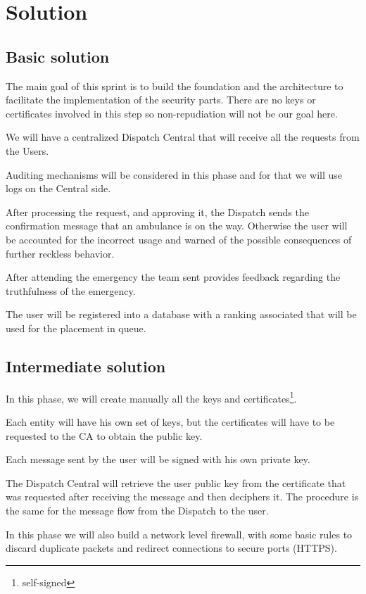 \documentclass[a4paper,titlepage,11pt]{article}
\begin{document}
\newpage

\section{Solution}
\subsection{Basic solution}
The main goal of this sprint is to build the foundation and the architecture to facilitate the implementation
of the security parts. There are no keys or certificates involved in this step so non-repudiation will not be
our goal here.

We will have a centralized Dispatch Central that will receive all the requests from the Users.

Auditing mechanisms will be considered in this phase and for that we will use logs on the Central side.

After processing the request, and approving it, the Dispatch sends the confirmation message that an ambulance is
on the way. Otherwise the user will be accounted for the incorrect usage and warned of the possible consequences
of further reckless behavior.

After attending the emergency the team sent provides feedback regarding the truthfulness of the emergency.

The user will be registered into a database with a ranking associated that will be used for the placement in queue.

\subsection{Intermediate solution}
In this phase, we will create manually all the keys and certificates\footnote{self-signed}.

Each entity will have his own set of keys, but the certificates will have to be requested to the CA to obtain
the public key.

Each message sent by the user will be signed with his own private key.

The Dispatch Central will retrieve the user public key from the certificate that was requested after receiving
the message and then deciphers it. The procedure is the same for the message flow from the Dispatch to the user.

In this phase we will also build a network level firewall, with some basic rules to discard duplicate packets
and redirect connections to secure ports (HTTPS).
\end{document}
